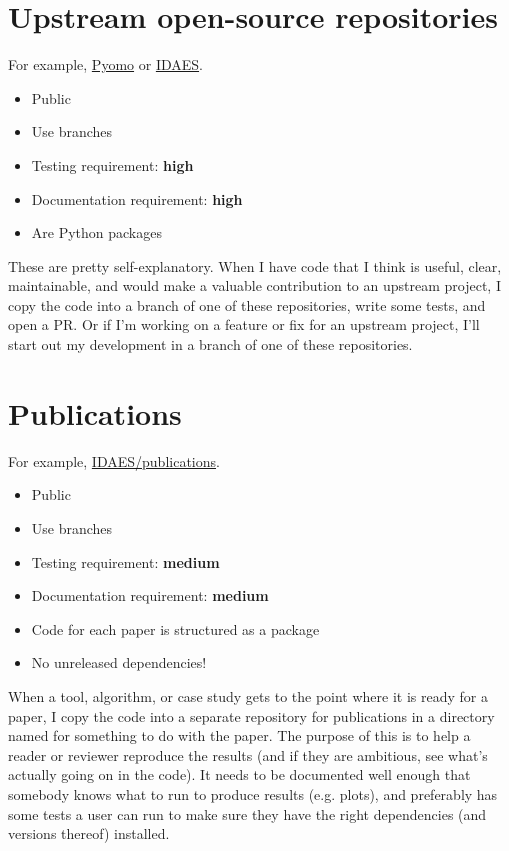 \documentclass{article}
\begin{document}
\section{Upstream open-source repositories}
For example, \href{https://github.com/pyomo/pyomo}{Pyomo} or
\href{https://github.com/idaes/idaes-pse}{IDAES}.
\begin{itemize}
  \item Public
  \item Use branches
  \item Testing requirement: {\color{red}\bf high}
  \item Documentation requirement: {\color{red}\bf high}
  \item Are Python packages
\end{itemize}

These are pretty self-explanatory. When I have code that I think
is useful, clear, maintainable, and would make a valuable
contribution to an upstream project, I copy the code into a branch
of one of these repositories, write some tests, and open a PR.
Or if I'm working on a feature or fix for an upstream project,
I'll start out my development in a branch of one of these
repositories.

\section{Publications}
For example, \href{https://github.com/idaes/publications}{IDAES/publications}.
\begin{itemize}
  \item Public
  \item Use branches
  \item Testing requirement: {\color{purple}\bf medium}
  \item Documentation requirement: {\color{purple}\bf medium}
  \item Code for each paper is structured as a package
  \item No unreleased dependencies!
\end{itemize}

When a tool, algorithm, or case study gets to the point where it is
ready for a paper, I copy the code into a separate repository for
publications in a directory named for something to do with the paper.
The purpose of this is to help a reader or reviewer reproduce the
results (and if they are ambitious, see what's actually going on
in the code).
It needs to be documented well enough that somebody knows what to run
to produce results (e.g. plots), and preferably has some tests a
user can run to make sure they have the right dependencies
(and versions thereof) installed.
\end{document}
